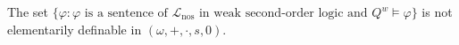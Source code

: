 The set $\{ \varphi : \varphi \text{ is a sentence of } \mathcal{L}_{\text{nos}} \text{ in weak second-order logic and } Q^w \models \varphi \}$ is not elementarily definable in $(\omega, +, \cdot, s, 0)$.
